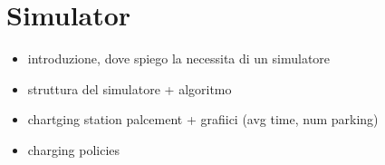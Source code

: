 
\chapter{Simulator}
\label{chap:5_simulator}
	\graphicspath{{Chapter5/}}


\begin{itemize}
	\item introduzione, dove spiego la necessita di un simulatore
	\item struttura del simulatore + algoritmo
	\item chartging station palcement + grafiici (avg time, num parking)
	\item charging policies
\end{itemize}













